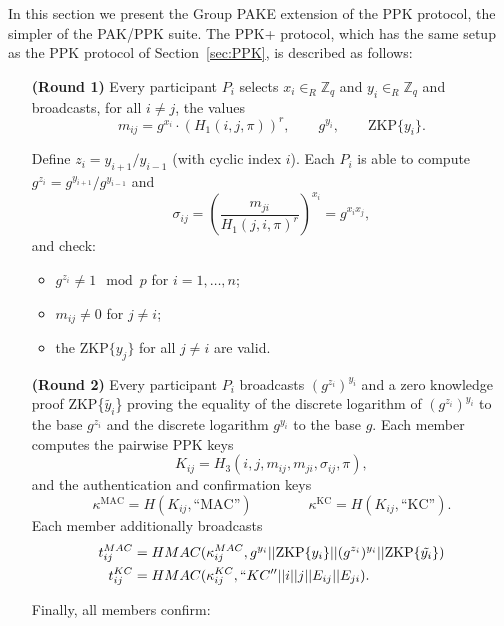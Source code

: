 In this section we present the Group PAKE extension of the PPK protocol, the simpler of the PAK/PPK
suite. The PPK+ protocol, which has the same setup as the PPK protocol of Section~\ref{sec:PPK}, is described as follows:
\\

\begin{itemize}
    \item[\textbf{(Round 1)}] Every participant $P_i$ selects $x_i\in_R \mathbb{Z}_q$ and $y_i\in_R \mathbb{Z}_q$ and 
        broadcasts, for all $i \neq j$, the values
        \[ m_{ij} = g^{x_i}\cdot (H_1(i, j, \pi))^r, \qquad g^{y_i}, \qquad \text{ZKP}\{y_i\}.\]
    \item[]
    \item[] Define $z_i = y_{i+1} / y_{i-1}$ (with cyclic index $i$). Each $P_i$ is able to compute $g^{z_i} = g^{y_{i+1}} / g^{y_{i-1}}$ and 
    \[ \sigma_{ij} = \left(\frac{m_{ji}}{H_1(j,i,\pi)^r}\right)^{x_i} = g^{x_i x_j},\] 
    and check: 
    \begin{itemize}
            \item $g^{z_i} \neq 1 \mod p$ for $i = 1, \ldots, n$;
            \item $m_{ij} \neq 0$ for $j \neq i$;
            \item the $\text{ZKP}\{y_j\}$ for all $j \neq i$ are valid.
        \end{itemize}
    \item[]
    \item[\textbf{(Round 2)}] Every participant $P_i$ broadcasts $(g^{z_i})^{y_i}$ and a zero knowledge proof
        ZKP\{$\tilde{y_i}$\} proving the equality of the discrete logarithm of $(g^{z_i})^{y_i}$ to the base
        $g^{z_i}$ and the discrete logarithm $g^{y_i}$ to the base $g$. Each member computes the pairwise PPK keys
        \[ K_{ij} = H_3(i,j,m_{ij}, m_{ji}, \sigma_{ij}, \pi), \]
        and the authentication and confirmation keys
        \[\kappa^{\text{MAC}} = H(K_{ij}, \text{``MAC''})\qquad\qquad \kappa^{\text{KC}} = H(K_{ij}, \text{``KC''}).\]
        Each member additionally broadcasts 
        \begin{align*}
        t_{ij}^{MAC} &= HMAC(\kappa_{ij}^{MAC},  g^{y_i} || \text{ZKP}\{y_i\} || (g^{z_i})^{y_i} || \text{ZKP}\{\tilde{y_i}\}) \\
        t_{ij}^{KC} &= HMAC(\kappa_{ij}^{KC}, ``KC'' || i || j || E_{ij} || E_{ji}).
        \end{align*}
    \item[]
    \item[]  Finally, all members confirm:

\end{itemize}
